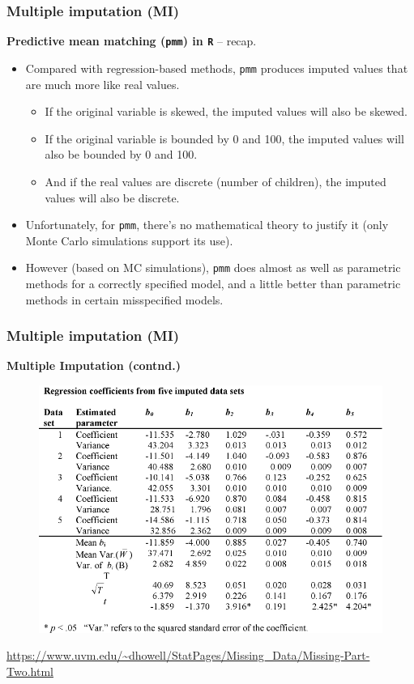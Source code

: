\documentclass{beamer}
\begin{document}
\begin{frame}
\frametitle{Multiple imputation (MI)}
\textbf{Predictive mean matching (\texttt{pmm}) in \texttt{R}} -- recap.\\
\bigskip
\begin{itemize}
    \item Compared with regression-based methods, \texttt{pmm} produces imputed values that are much more like real values. 
    \begin{itemize}
        \item If the original variable is skewed, the imputed values will also be skewed.
        \item If the original variable is bounded by 0 and 100, the imputed values will also be bounded by 0 and 100.
        \item And if the real values are discrete (number of children), the imputed values will also be discrete. 
    \end{itemize} 
    \smallskip
    \item Unfortunately, for \texttt{pmm}, there’s no mathematical theory to justify it (only Monte Carlo simulations support its use).
    \smallskip
    \item However (based on MC simulations),  \texttt{pmm} does almost as well as parametric methods for a correctly specified model, and a little better than parametric methods in certain misspecified models.
\end{itemize}
\end{frame}
\begin{frame}
\frametitle{Multiple imputation (MI)}
\textbf{Multiple Imputation (contnd.) }
\begin{figure}
\includegraphics[width=0.7\linewidth]{IMG/mitable.jpg}
\end{figure}
\scriptsize{\url{https://www.uvm.edu/~dhowell/StatPages/Missing_Data/Missing-Part-Two.html}}
\end{frame}
\end{document}
